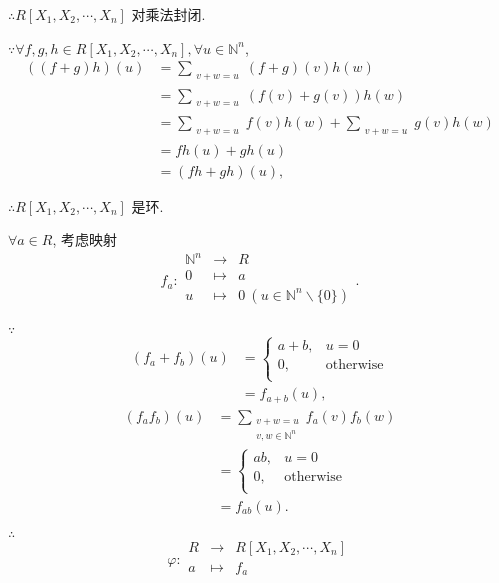 \documentclass[UTF8]{ctexart}
\begin{document}
$\therefore R[X_1,X_2,\cdots,X_n]$ 对乘法封闭.

$\because\forall f,g,h\in R[X_1,X_2,\cdots,X_n],\forall u\in\mathbb{N}^n$,
\begin{align*}
    ((f+g)h)(u) & =\sum\limits_{\substack{v+w=u}}(f+g)(v)h(w) \\
    & =\sum\limits_{\substack{v+w=u}}(f(v)+g(v))h(w) \\
    & =\sum\limits_{\substack{v+w=u}}f(v)h(w)+\sum\limits_{\substack{v+w=u}}g(v)h(w) \\
    & =fh(u)+gh(u) \\
    & =(fh+gh)(u),
\end{align*}

$\therefore R[X_1,X_2,\cdots,X_n]$ 是环.

$\forall a\in R$, 考虑映射
\[f_a:\begin{array}{rcl}
    \mathbb{N}^n & \to & R \\
    0 & \mapsto & a \\
    u & \mapsto & 0\ (u\in\mathbb{N}^n\backslash\{0\}) \\
\end{array}.\]

$\because$
\begin{align*}
    (f_a+f_b)(u) & =\begin{cases}
                        a+b, & u=0 \\
                        0, & \text{otherwise} \\
                    \end{cases} \\
    & =f_{a+b}(u),
\end{align*}
\begin{align*}
    (f_af_b)(u) & =\sum\limits_{\substack{v+w=u\\v,w\in\mathbb{N}^n}}f_a(v)f_b(w) \\
    & =\begin{cases}
            ab, & u=0 \\
            0, & \text{otherwise} \\
        \end{cases} \\
    & =f_{ab}(u).
\end{align*}

$\therefore$
\[\varphi:\begin{array}{rcl}
    R & \to & R[X_1,X_2,\cdots,X_n] \\
    a & \mapsto & f_a \\
\end{array}\]
\end{document}
